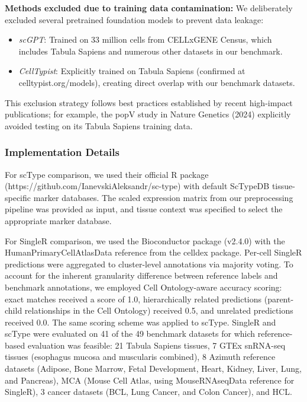 \documentclass[pdflatex,sn-nature]{sn-jnl}%
\theoremstyle{thmstyleone}%
\theoremstyle{thmstyletwo}%
\theoremstyle{thmstylethree}%
\begin{document}
\textbf{Methods excluded due to training data contamination:} We deliberately excluded several pretrained foundation models to prevent data leakage:
\begin{itemize}
    \item \textit{scGPT}\cite{cui2024scgpt}: Trained on 33 million cells from CELLxGENE Census, which includes Tabula Sapiens and numerous other datasets in our benchmark.
    \item \textit{CellTypist}: Explicitly trained on Tabula Sapiens (confirmed at celltypist.org/models), creating direct overlap with our benchmark datasets.
\end{itemize}
This exclusion strategy follows best practices established by recent high-impact publications; for example, the popV study in Nature Genetics (2024) explicitly avoided testing on its Tabula Sapiens training data\cite{ergenConsensusPredictionCell2024}.

\subsubsection{Implementation Details}
For scType comparison, we used their official R package (https://github.com/IanevskiAleksandr/sc-type) with default ScTypeDB tissue-specific marker databases. The scaled expression matrix from our preprocessing pipeline was provided as input, and tissue context was specified to select the appropriate marker database.

For SingleR comparison, we used the Bioconductor package (v2.4.0) with the HumanPrimaryCellAtlasData reference from the celldex package. Per-cell SingleR predictions were aggregated to cluster-level annotations via majority voting. To account for the inherent granularity difference between reference labels and benchmark annotations, we employed Cell Ontology-aware accuracy scoring: exact matches received a score of 1.0, hierarchically related predictions (parent-child relationships in the Cell Ontology) received 0.5, and unrelated predictions received 0.0. The same scoring scheme was applied to scType. SingleR and scType were evaluated on 41 of the 49 benchmark datasets for which reference-based evaluation was feasible: 21 Tabula Sapiens tissues, 7 GTEx snRNA-seq tissues (esophagus mucosa and muscularis combined), 8 Azimuth reference datasets (Adipose, Bone Marrow, Fetal Development, Heart, Kidney, Liver, Lung, and Pancreas), MCA (Mouse Cell Atlas, using MouseRNAseqData reference for SingleR), 3 cancer datasets (BCL, Lung Cancer, and Colon Cancer), and HCL.
\end{document}
